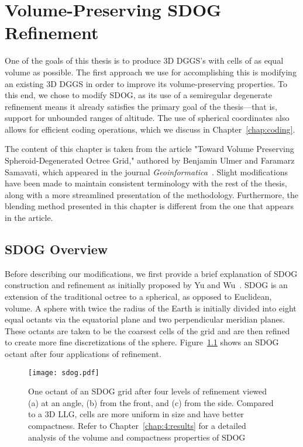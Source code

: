 \chapter{Volume-Preserving SDOG Refinement} \label{chap:sdog}
One of the goals of this thesis is to produce 3D DGGS's with cells of as equal volume as possible.
The first approach we use for accomplishing this is modifying an existing 3D DGGS in order to improve its volume-preserving properties.
To this end, we chose to modify SDOG, as its use of a semiregular degenerate refinement means it already satisfies the primary goal of the thesis---that is, support for unbounded ranges of altitude.
The use of spherical coordinates also allows for efficient coding operations, which we discuss in Chapter~\ref{chap:coding}.

The content of this chapter is taken from the article "Toward Volume Preserving Spheroid-Degenerated Octree Grid," authored by Benjamin Ulmer and Faramarz Samavati, which appeared in the journal \textit{Geoinformatica}~\cite{ulmer2020toward}.
Slight modifications have been made to maintain consistent terminology with the rest of the thesis, along with a more streamlined presentation of the methodology. Furthermore, the blending method presented in this chapter is different from the one that appears in the article.


\section{SDOG Overview} \label{chap:4:sdog}
Before describing our modifications, we first provide a brief explanation of SDOG construction and refinement as initially proposed by Yu and Wu~\cite{yu2009sdog}.
SDOG is an extension of the traditional octree to a spherical, as opposed to Euclidean, volume.
A sphere with twice the radius of the Earth is initially divided into eight equal octants via the equatorial plane and two perpendicular meridian planes.
These octants are taken to be the coarsest cells of the grid and are then refined to create more fine discretizations of the sphere.
Figure~\ref{fig:sdog} shows an SDOG octant after four applications of refinement.


\begin{figure}[ht!]
	\centering
	\texttt{[image: sdog.pdf]}
	\caption[Different views of an SDOG octant]{
		One octant of an SDOG grid after four levels of refinement viewed (a) at an angle, (b) from the front, and (c) from the side.
		Compared to a 3D LLG, cells are more uniform in size and have better compactness.
		Refer to Chapter~\ref{chap:4:results} for a detailed analysis of the volume and compactness properties of SDOG
	}
	\label{fig:sdog}
\end{figure}



